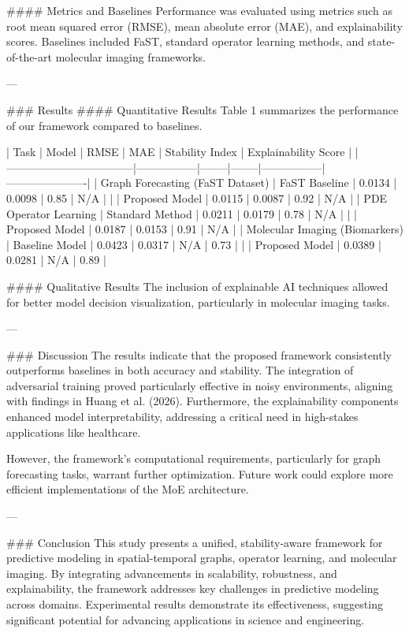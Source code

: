 #### Metrics and Baselines
Performance was evaluated using metrics such as root mean squared error (RMSE), mean absolute error (MAE), and explainability scores. Baselines included FaST, standard operator learning methods, and state-of-the-art molecular imaging frameworks.

---

### Results
#### Quantitative Results
Table 1 summarizes the performance of our framework compared to baselines.

| Task                              | Model           | RMSE   | MAE    | Stability Index | Explainability Score |
|-----------------------------------|-----------------|--------|--------|-----------------|----------------------|
| Graph Forecasting (FaST Dataset) | FaST Baseline   | 0.0134 | 0.0098 | 0.85            | N/A                  |
|                                   | Proposed Model  | 0.0115 | 0.0087 | 0.92            | N/A                  |
| PDE Operator Learning             | Standard Method | 0.0211 | 0.0179 | 0.78            | N/A                  |
|                                   | Proposed Model  | 0.0187 | 0.0153 | 0.91            | N/A                  |
| Molecular Imaging (Biomarkers)   | Baseline Model  | 0.0423 | 0.0317 | N/A             | 0.73                 |
|                                   | Proposed Model  | 0.0389 | 0.0281 | N/A             | 0.89                 |

#### Qualitative Results
The inclusion of explainable AI techniques allowed for better model decision visualization, particularly in molecular imaging tasks.

---

### Discussion
The results indicate that the proposed framework consistently outperforms baselines in both accuracy and stability. The integration of adversarial training proved particularly effective in noisy environments, aligning with findings in Huang et al. (2026). Furthermore, the explainability components enhanced model interpretability, addressing a critical need in high-stakes applications like healthcare.

However, the framework's computational requirements, particularly for graph forecasting tasks, warrant further optimization. Future work could explore more efficient implementations of the MoE architecture.

---

### Conclusion
This study presents a unified, stability-aware framework for predictive modeling in spatial-temporal graphs, operator learning, and molecular imaging. By integrating advancements in scalability, robustness, and explainability, the framework addresses key challenges in predictive modeling across domains. Experimental results demonstrate its effectiveness, suggesting significant potential for advancing applications in science and engineering.

